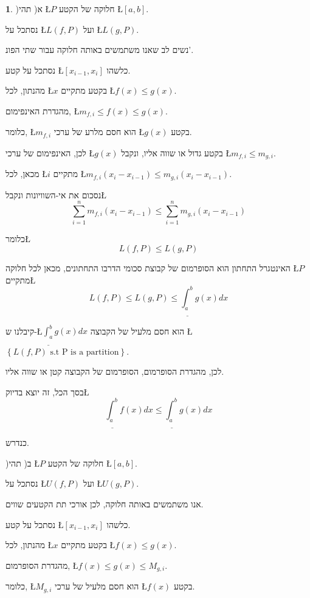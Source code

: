 \documentclass[english,hebrew]{article}
\theoremstyle{plain}
\theoremstyle{definition}
\theoremstyle{definition}
\newtheorem*{sol*}{\protect\solutionname}
\providecommand{\solutionname}{פתרון}
\begin{document}
\begin{sol*}
)א( תהי \L{$P$} חלוקה של הקטע \L{$\left[a,b\right]$}.

נסתכל על \L{$L\left(f,P\right)$} ועל \L{$L\left(g,P\right)$}.

נשים לב שאנו משתמשים באותה חלוקה עבור שתי הפונ'.

נסתכל על קטע \L{$\left[x_{i-1},x_{i}\right]$} כלשהו.

מהנתון, לכל \L{$x$} בקטע מתקיים \L{$f(x)\le g(x)$}.

מהגדרת האינפימום, \L{$m_{f,i}\le f(x)\le g(x)$}.

כלומר, \L{$m_{f,i}$} הוא חסם מלרע של ערכי \L{$g(x)$} בקטע.

לכן, האינפימום של ערכי \L{$g(x)$} בקטע גדול או שווה אליו, ונקבל \L{$m_{f,i}\le m_{g,i}$}.

מכאן, לכל \L{$i$} מתקיים \L{$m_{f,i}\left(x_{i}-x_{i-1}\right)\le m_{g,i}\left(x_{i}-x_{i-1}\right)$}.

נסכום את אי-השוויונות ונקבל\L{%
\[
\underset{i=1}{\overset{n}{\sum}}m_{f,i}\left(x_{i}-x_{i-1}\right)\le\underset{i=1}{\overset{n}{\sum}}m_{g,i}\left(x_{i}-x_{i-1}\right)
\]
}%

כלומר\L{%
\[
L\left(f,P\right)\le L\left(g,P\right)
\]
}%

האינטגרל התחתון הוא הסופרמום של קבוצת סכומי הדרבו התחתונים, מכאן לכל
חלוקה \L{$P$} מתקיים\L{%
\[
L\left(f,P\right)\le L\left(g,P\right)\le\underline{\int_{a}^{b}}g(x)dx
\]
}%

קיבלנו ש-\L{$\underline{\int_{a}^{b}}g(x)dx$} הוא חסם מלעיל של הקבוצה
\L{$\left\{ L\left(f,P\right)\text{ s.t P is a partition}\right\} $}.

לכן, מהגדרת הסופרמום, הסופרמום של הקבוצה קטן או שווה אליו. 

בסך הכל, זה יוצא בדיוק\L{%
\[
\underline{\int_{a}^{b}}f(x)dx\le\underline{\int_{a}^{b}}g(x)dx
\]
}%

כנדרש.

)ב( תהי \L{$P$} חלוקה של הקטע \L{$\left[a,b\right]$}.

נסתכל על \L{$U\left(f,P\right)$} ועל \L{$U\left(g,P\right)$}.

אנו משתמשים באותה חלוקה, לכן אורכי תת הקטעים שווים.

נסתכל על קטע \L{$\left[x_{i-1},x_{i}\right]$} כלשהו.

מהנתון, לכל \L{$x$} בקטע מתקיים \L{$f(x)\le g(x)$}.

מהגדרת הסופרמום, \L{$f(x)\le g(x)\le M_{g,i}$}.

כלומר, \L{$M_{g,i}$} הוא חסם מלעיל של ערכי \L{$f(x)$} בקטע.


\end{sol*}
\end{document}
